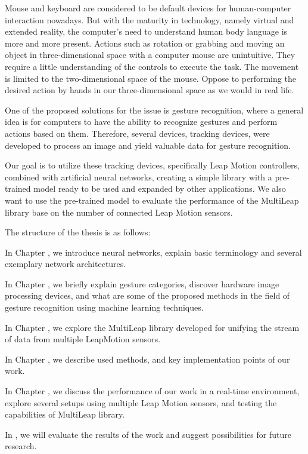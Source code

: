 Mouse and keyboard are considered to be default devices for human-computer interaction nowadays. But with the maturity in technology, namely virtual and extended reality, the computer's need to understand human body language is more and more present. Actions such as rotation or grabbing and moving an object in three-dimensional space with a computer mouse are unintuitive. They require a little understanding of the controls to execute the task. The movement is limited to the two-dimensional space of the mouse. Oppose to performing the desired action by hands in our three-dimensional space as we would in real life.

One of the proposed solutions for the issue is gesture recognition, where a general idea is for computers to have the ability to recognize gestures and perform actions based on them. Therefore, several devices, tracking devices, were developed to process an image and yield valuable data for gesture recognition.

Our goal is to utilize these tracking devices, specifically Leap Motion controllers, combined with artificial neural networks, creating a simple library with a pre-trained model ready to be used and expanded by other applications. We also want to use the pre-trained model to evaluate the performance of the MultiLeap library base on the number of connected Leap Motion sensors.

The structure of the thesis is as follows:
\begin{description}

    \item In Chapter , we introduce neural networks, explain basic terminology and several exemplary network architectures.
    
    \item In Chapter , we briefly explain gesture categories, discover hardware image processing devices, and what are some of the proposed methods in the field of gesture recognition using machine learning techniques.
    
    \item In Chapter , we explore the MultiLeap library developed for unifying the stream of data from multiple LeapMotion sensors.
    
    \item In Chapter , we describe used methods, and key implementation points of our work.
    
    \item In Chapter , we discuss the performance of our work in a real-time environment, explore several setups using multiple Leap Motion sensors, and testing the capabilities of MultiLeap library.

    \item In , we will evaluate the results of the work and suggest possibilities for future research.
\end{description}